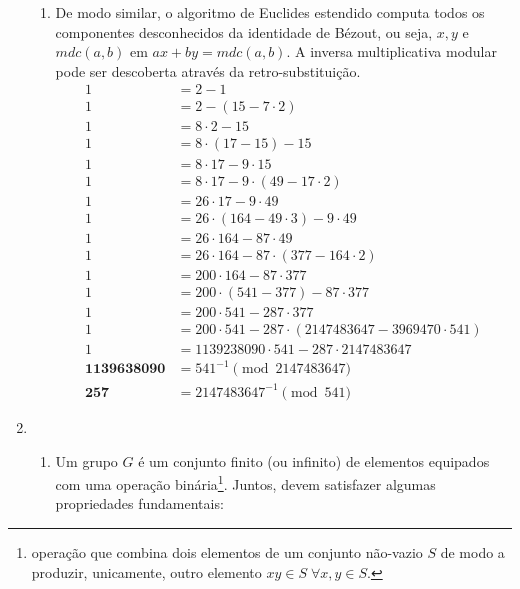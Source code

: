 \documentclass[fleqn]{../sftex/sftex}
\begin{document}
\begin{enumerate}[label= (\textbf{\arabic*})]
\begin{enumerate}
\item De modo similar, o algoritmo de Euclides estendido computa todos os
componentes desconhecidos da identidade de Bézout, ou seja, $x, y$ e
$mdc(a, b)$ em $ax + by = mdc(a, b)$. A inversa multiplicativa modular pode
ser descoberta através da retro-substituição.
\begin{align*}
1 &= 2 - 1 \\
1 &= 2 - (15 - 7 \cdot 2) \\
1 &= 8 \cdot 2 - 15 \\
1 &= 8 \cdot (17 - 15) - 15 \\
1 &= 8 \cdot 17 - 9 \cdot 15 \\
1 &= 8 \cdot 17 - 9 \cdot (49 - 17 \cdot 2) \\
1 &= 26 \cdot 17 - 9 \cdot 49 \\
1 &= 26 \cdot (164 - 49 \cdot 3) - 9 \cdot 49 \\
1 &= 26 \cdot 164 - 87 \cdot 49 \\
1 &= 26 \cdot 164 - 87 \cdot (377 - 164 \cdot 2) \\
1 &= 200 \cdot 164 - 87 \cdot 377 \\
1 &= 200 \cdot (541 - 377) - 87 \cdot 377 \\
1 &= 200 \cdot 541 - 287 \cdot 377 \\
1 &= 200 \cdot 541 - 287 \cdot (2147483647 - 3969470 \cdot 541) \\
1 &= 1139238090 \cdot 541 - 287 \cdot 2147483647 \\
\boldsymbol{1139638090} &= 541^{-1} \pmod{2147483647} \\
\boldsymbol{257} &= 2147483647^{-1} \pmod{541}
\end{align*}

\end{enumerate}

\newpage

\item

\begin{enumerate}

\item Um grupo $G$ é um conjunto finito (ou infinito) de elementos equipados
com uma operação binária\footnote{operação que combina dois elementos de um
conjunto não-vazio $S$ de modo a produzir, unicamente, outro elemento
$xy \in S \; \forall x, y \in S$.}. Juntos, devem satisfazer algumas
propriedades fundamentais:

\begin{enumerate}


\end{enumerate}
\end{enumerate}
\end{enumerate}
\end{document}
